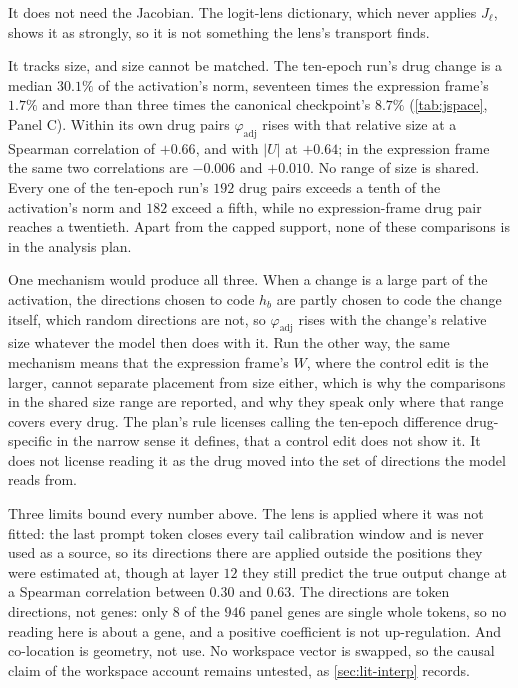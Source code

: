 It does not need the Jacobian. The logit-lens dictionary, which never applies
$J_\ell$, shows it as strongly, so it is not something the lens's transport
finds.

It tracks size, and size cannot be matched. The ten-epoch run's drug change is a
median $30.1\%$ of the activation's norm, seventeen times the expression frame's
$1.7\%$ and more than three times the canonical checkpoint's $8.7\%$
(\cref{tab:jspace}, Panel C). Within its own drug pairs $\varphi_{\textrm{adj}}$
rises with that relative size at a Spearman correlation of $+0.66$, and with
$|U|$ at $+0.64$; in the expression frame the same two correlations are $-0.006$
and $+0.010$. No range of size is shared. Every one of the ten-epoch run's $192$
drug pairs exceeds a tenth of the activation's norm and $182$ exceed a fifth,
while no expression-frame drug pair reaches a twentieth. Apart from the capped
support, none of these comparisons is in the analysis plan.

One mechanism would produce all three. When a change is a large part of the
activation, the directions chosen to code $h_b$ are partly chosen to code the
change itself, which random directions are not, so $\varphi_{\textrm{adj}}$
rises with the change's relative size whatever the model then does with it. Run
the other way, the same mechanism means that the expression frame's $W$, where
the control edit is the larger, cannot separate placement from size either,
which is why the comparisons in the shared size range are reported, and why they
speak only where that range covers every drug. The plan's rule licenses calling
the ten-epoch difference drug-specific in the narrow sense it defines, that a
control edit does not show it. It does not license reading it as the drug moved
into the set of directions the model reads from.

\begin{scopelimit}
Three limits bound every number above. The lens is applied where it was not
fitted: the last prompt token closes every tail calibration window and is never
used as a source, so its directions there are applied outside the positions they
were estimated at, though at layer $12$ they still predict the true output change
at a Spearman correlation between $0.30$ and $0.63$. The directions are token
directions, not genes: only $8$ of the $946$ panel genes are single whole tokens,
so no reading here is about a gene, and a positive coefficient is not
up-regulation. And co-location is geometry, not use. No workspace vector is
swapped, so the causal claim of the workspace account remains untested, as
\cref{sec:lit-interp} records.
\end{scopelimit}

